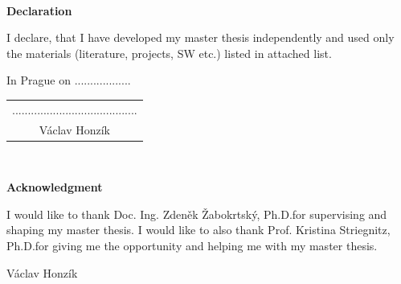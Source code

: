 \documentclass[a4paper,12pt,twoside]{report}
\newcommand{\autor}{Václav Honzík}           %
\newcommand{\vedouci}{Doc. Ing. Zdeněk Žabokrtský, Ph.D.}         %
\newcommand{\konzultant}{Prof. Kristina Striegnitz, Ph.D.} %
\begin{document}
\newpage %
\thispagestyle{empty}  %

~ %
\vfill %

{\bf Declaration} %

\vspace{0.5cm} %
I declare, that I have developed my master thesis independently and used only the materials (literature, projects, SW etc.) listed in attached list.

\vspace{5mm}In Prague on ..................\hfill  %
    \begin{tabular}{c}                               %
    ........................................\\       %
    \autor                                           %
    \end{tabular}                                    %



\newpage
\thispagestyle{empty}

~
\vfill %

{\bf Acknowledgment}

\vspace{5mm} %
I would like to thank \vedouci for supervising and shaping my master thesis. I would like to also thank \konzultant for giving me the opportunity and helping me with my master thesis.

\begin{flushright}
\autor
\end{flushright}  %

\newpage   %
\thispagestyle{empty}   %

\newbox\odstavecbox
\newlength\vyskaodstavce
\newcommand\odstavec[2]{%
    \setbox\odstavecbox=\hbox{%
         \parbox[t]{#1}{#2\vrule width 0pt depth 4pt}}%
    \global\vyskaodstavce=\dp\odstavecbox
    \box\odstavecbox}
\newcommand{\delka}{120mm} %
\end{document}

